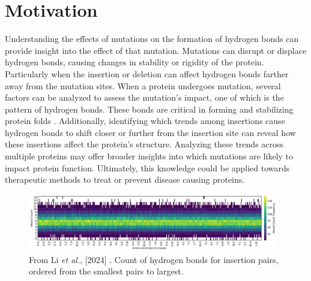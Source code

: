 \documentclass[sigconf, screen, authorversion, authoraddress=false, oneside]{acmart}
\begin{document}
\section{Motivation}
Understanding the effects of mutations on the formation of hydrogen bonds can provide insight into the effect of that mutation. Mutations can disrupt or displace hydrogen bonds, causing changes in stability or rigidity of the protein. Particularly when the insertion or deletion can affect hydrogen bonds farther away from the mutation sites. When a protein undergoes mutation, several factors can be analyzed to assess the mutation’s impact, one of which is the pattern of hydrogen bonds. These bonds are critical in forming and stabilizing protein folds \cite{BORDO1994504}. Additionally, identifying which trends among insertions cause hydrogen bonds to shift closer or further from the insertion site can reveal how these insertions affect the protein's structure. Analyzing these trends across multiple proteins may offer broader insights into which mutations are likely to impact protein function. Ultimately, this knowledge could be applied towards therapeutic methods to treat or prevent disease causing proteins.


\begin{figure}[!ht]
    \centering
    \includegraphics[width=0.975\textwidth]{multimute_hbond_plot.png}
    \caption{From Li \textit{et al.}, [2024] \cite{10.1093/bioadv/vbae138}. Count of hydrogen bonds for insertion pairs, ordered from the smallest pairs to largest.}
    \label{Figure 2}
\end{figure}
\end{document}
